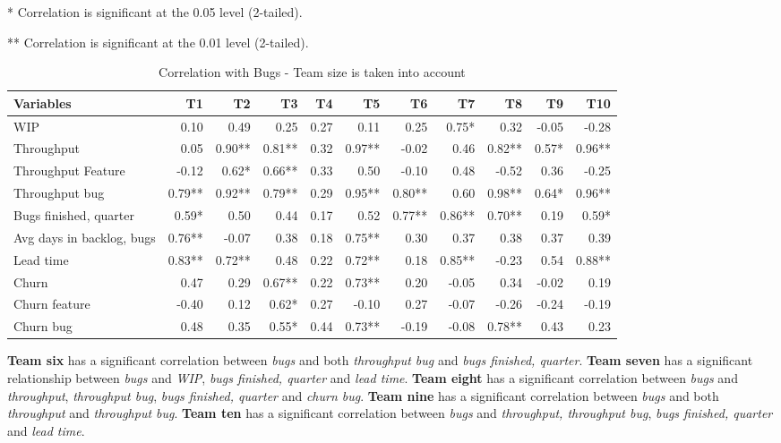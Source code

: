 \documentclass[UKenglish]{ifimaster}  %
\begin{document}
\FloatBarrier
\begin{table}[H]
 \caption{Correlation with Bugs - Team size is taken into account}
 \centerline {* Correlation is significant at the 0.05 level (2-tailed).}
\centerline{** Correlation is significant at the 0.01 level (2-tailed).}
  \begin{adjustwidth}{-1cm}{}
 \centering
 \begin{tabular}{|l|r|r|r|r|r|r|r|r|r|r|}
\hline
 \textbf{Variables} & \bf{T1} & \bf{T2} & \bf{T3} & \bf{T4} & \bf{T5} & \bf{T6} & \bf{T7} & \bf{T8} & \bf{T9} & \bf{T10}\\ \hline
 WIP  & 0.10 & 0.49 & 0.25 & 0.27 & 0.11 & 0.25 & 0.75* & 0.32 & -0.05 & -0.28 \\ \hline
 Throughput  & 0.05 & 0.90** & 0.81** & 0.32 & 0.97** & -0.02 & 0.46 & 0.82** & 0.57* & 0.96** \\ \hline
 Throughput Feature  & -0.12 & 0.62* & 0.66** & 0.33 & 0.50 & -0.10 & 0.48 & -0.52 & 0.36 & -0.25 \\ \hline
 Throughput bug  & 0.79** & 0.92** & 0.79** & 0.29 & 0.95** & 0.80** & 0.60 & 0.98** & 0.64* & 0.96** \\ \hline
 Bugs finished, quarter  & 0.59* & 0.50 & 0.44 & 0.17 & 0.52 & 0.77** & 0.86** & 0.70** & 0.19 & 0.59* \\ \hline
 Avg days in backlog, bugs  & 0.76** & -0.07 & 0.38 & 0.18 & 0.75** & 0.30 & 0.37 & 0.38 & 0.37 & 0.39 \\ \hline
 Lead time  & 0.83** & 0.72** & 0.48 & 0.22 & 0.72** & 0.18 & 0.85** & -0.23 & 0.54 & 0.88** \\ \hline
 Churn  & 0.47 & 0.29 & 0.67** & 0.22 & 0.73** & 0.20 & -0.05 & 0.34 & -0.02 & 0.19 \\ \hline
 Churn feature  & -0.40 & 0.12 & 0.62* & 0.27 & -0.10 & 0.27 & -0.07 & -0.26 & -0.24 & -0.19 \\ \hline
 Churn bug  & 0.48 & 0.35 & 0.55* & 0.44 & 0.73** & -0.19 & -0.08 & 0.78** & 0.43 & 0.23 \\ \hline
\end{tabular}

 \label{corr:Bugs:v2}

\end{adjustwidth}
\end{table}

\textbf{Team six} has a significant correlation between \textit{bugs} and both \textit{throughput bug} and \textit{bugs finished, quarter}. \textbf{Team seven} has a significant relationship between \textit{bugs} and \textit{WIP}, \textit{bugs finished, quarter} and \textit{lead time}. \textbf{Team eight} has a significant correlation between \textit{bugs} and \textit{throughput}, \textit{throughput bug}, \textit{bugs finished, quarter} and \textit{churn bug}. \textbf{Team nine} has a significant correlation between \textit{bugs} and both \textit{throughput} and \textit{throughput bug}. \textbf{Team ten} has a significant correlation between \textit{bugs} and \textit{throughput, throughput bug}, \textit{bugs finished, quarter} and \textit{lead time}.
\end{document}
